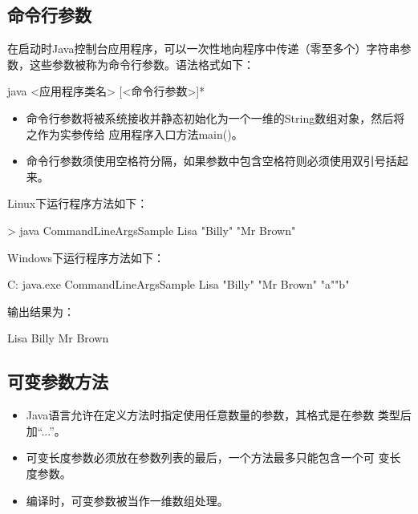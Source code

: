 \subsection{命令行参数}

在启动时Java控制台应用程序，可以一次性地向程序中传递（零至多个）字符串参
数，这些参数被称为命令行参数。语法格式如下：

\begin{shCode}
  java <应用程序类名> [<命令行参数>]*
\end{shCode}


\begin{itemize}\kai
\item 命令行参数将被系统接收并静态初始化为一个一维的String数组对象，然后将之作为实参传给
  应用程序入口方法main()。
\item 命令行参数须使用空格符分隔，如果参数中包含空格符则必须使用双引号括起来。
\end{itemize}



Linux下运行程序方法如下：

\begin{shCode}
  > java CommandLineArgsSample Lisa "Billy" "Mr Brown"
\end{shCode}

Windows下运行程序方法如下：

\begin{shCode}
  C:\> java.exe CommandLineArgsSample Lisa "Billy" "Mr Brown" "a""b" 
\end{shCode}

输出结果为：

\begin{stdoutCode}
  Lisa
  Billy
  Mr Brown
\end{stdoutCode}


\subsection{可变参数方法}

\begin{itemize}
\item Java语言允许在定义方法时指定使用任意数量的参数，其格式是在参数
  类型后加“...”。
\item 可变长度参数必须放在参数列表的最后，一个方法最多只能包含一个可
  变长度参数。
\item 编译时，可变参数被当作{\Red\hei 一维数组处理}。
\end{itemize}

